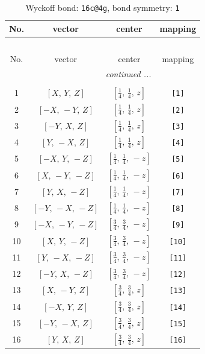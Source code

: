 \documentclass[fleqn,8pt]{jsarticle}
\begin{document}
\begin{longtable}{cccc}
\caption{Wyckoff bond: {\tt 16c@4g}, bond symmetry: {\tt 1}}
 \\
 \hline \hline
No. & vector & center & mapping \\ \hline \endfirsthead

\multicolumn{3}{l}{\tablename\ \thetable{}} \\
 \hline \hline
No. & vector & center & mapping \\ \hline \endhead

 \hline \hline
\multicolumn{3}{r}{\footnotesize\it continued ...} \\ \endfoot

 \hline \hline
\multicolumn{3}{r}{} \\ \endlastfoot

1 & $\left[ X,\, Y,\, Z \right]$ & $\left[ \frac{1}{4},\, \frac{1}{4},\, z \right]$ & {\tt [1]} \\ \hline
2 & $\left[ - X,\, - Y,\, Z \right]$ & $\left[ \frac{1}{4},\, \frac{1}{4},\, z \right]$ & {\tt [2]} \\ \hline
3 & $\left[ - Y,\, X,\, Z \right]$ & $\left[ \frac{1}{4},\, \frac{1}{4},\, z \right]$ & {\tt [3]} \\ \hline
4 & $\left[ Y,\, - X,\, Z \right]$ & $\left[ \frac{1}{4},\, \frac{1}{4},\, z \right]$ & {\tt [4]} \\ \hline
5 & $\left[ - X,\, Y,\, - Z \right]$ & $\left[ \frac{1}{4},\, \frac{1}{4},\, - z \right]$ & {\tt [5]} \\ \hline
6 & $\left[ X,\, - Y,\, - Z \right]$ & $\left[ \frac{1}{4},\, \frac{1}{4},\, - z \right]$ & {\tt [6]} \\ \hline
7 & $\left[ Y,\, X,\, - Z \right]$ & $\left[ \frac{1}{4},\, \frac{1}{4},\, - z \right]$ & {\tt [7]} \\ \hline
8 & $\left[ - Y,\, - X,\, - Z \right]$ & $\left[ \frac{1}{4},\, \frac{1}{4},\, - z \right]$ & {\tt [8]} \\ \hline
9 & $\left[ - X,\, - Y,\, - Z \right]$ & $\left[ \frac{3}{4},\, \frac{3}{4},\, - z \right]$ & {\tt [9]} \\ \hline
10 & $\left[ X,\, Y,\, - Z \right]$ & $\left[ \frac{3}{4},\, \frac{3}{4},\, - z \right]$ & {\tt [10]} \\ \hline
11 & $\left[ Y,\, - X,\, - Z \right]$ & $\left[ \frac{3}{4},\, \frac{3}{4},\, - z \right]$ & {\tt [11]} \\ \hline
12 & $\left[ - Y,\, X,\, - Z \right]$ & $\left[ \frac{3}{4},\, \frac{3}{4},\, - z \right]$ & {\tt [12]} \\ \hline
13 & $\left[ X,\, - Y,\, Z \right]$ & $\left[ \frac{3}{4},\, \frac{3}{4},\, z \right]$ & {\tt [13]} \\ \hline
14 & $\left[ - X,\, Y,\, Z \right]$ & $\left[ \frac{3}{4},\, \frac{3}{4},\, z \right]$ & {\tt [14]} \\ \hline
15 & $\left[ - Y,\, - X,\, Z \right]$ & $\left[ \frac{3}{4},\, \frac{3}{4},\, z \right]$ & {\tt [15]} \\ \hline
16 & $\left[ Y,\, X,\, Z \right]$ & $\left[ \frac{3}{4},\, \frac{3}{4},\, z \right]$ & {\tt [16]} \\
\end{longtable}
\end{document}
